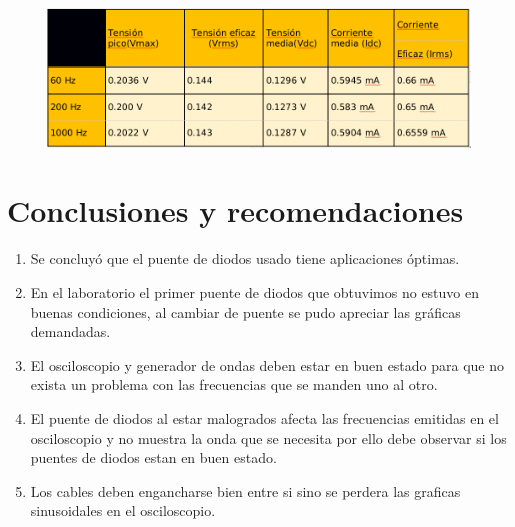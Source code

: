 \documentclass[a4paper,12pt]{report}
\begin{document}
\begin{enumerate}
\begin{figure}[H]
\end{figure}
\begin{figure}[H]
\centering
\includegraphics[scale=0.45]{kgda2.png}
\end{figure}

\end{enumerate}
\chapter{Conclusiones y recomendaciones}
\begin{enumerate}
\item Se concluyó que el puente de diodos usado tiene aplicaciones óptimas.
\item En el laboratorio el primer puente de diodos que obtuvimos no estuvo en buenas condiciones, al cambiar de puente se pudo apreciar las gráficas demandadas.
\item El osciloscopio y generador de ondas deben estar en buen estado para que no exista un problema con las frecuencias que se manden uno al otro.
\item El puente de diodos al estar malogrados afecta las frecuencias emitidas en el osciloscopio y no muestra la onda que se necesita por ello debe observar si los puentes de diodos estan en buen estado.
\item Los cables deben engancharse bien entre si sino se perdera las graficas sinusoidales en el osciloscopio.
\end{enumerate}
\end{document}
